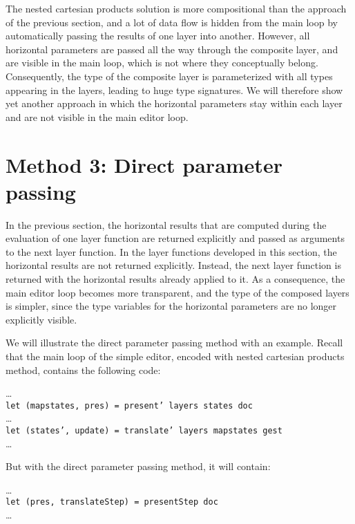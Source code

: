 \par {}The nested cartesian products
      solution is more compositional than the approach of the previous section, and a
      lot of data flow is hidden from the main loop by automatically passing the
      results of one layer into another. However, all horizontal parameters are
      passed all the way through the composite layer, and are visible in the main
      loop, which is not where they conceptually belong. Consequently, the type of
      the composite layer is parameterized with all types appearing in the layers,
      leading to huge type signatures. We will therefore show yet another approach in
      which the horizontal parameters stay within each layer and are not visible in
      the main editor loop.
\section{Method 3: Direct parameter passing}
\label{sectdpp}
\par In the previous section, the horizontal results that are computed during
      the evaluation of one layer function are returned explicitly and passed as
      arguments to the next layer function. In the layer functions developed in this
      section, the horizontal results are not returned explicitly. Instead, the next layer function is returned with the
      horizontal results already applied to it. As a consequence, the main editor
      loop becomes more transparent, and the type of the composed layers is simpler,
      since the type variables for the horizontal parameters are no longer explicitly
      visible.
\par We will illustrate the direct parameter passing method with an example.
      Recall that the main loop of the simple editor, encoded with nested cartesian
      products method, contains the following code:\par
\dots\\
{\tt let (mapstates, pres) = present' layers states doc}\\
\dots\\
{\tt let (states', update) = translate' layers mapstates gest}\\
\dots
\par But with the direct parameter passing method, it will contain:\par
\dots\\
{\tt let (pres, translateStep) = presentStep doc}\\
\dots\\
